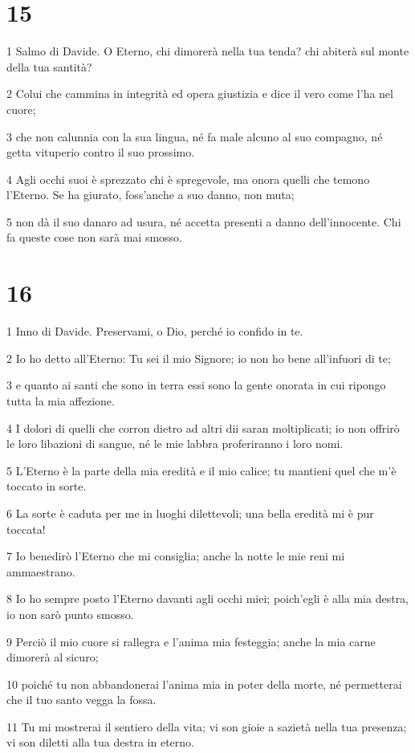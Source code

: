 \chapter{15}

\par 1 Salmo di Davide. O Eterno, chi dimorerà nella tua tenda? chi abiterà sul monte della tua santità?
\par 2 Colui che cammina in integrità ed opera giustizia e dice il vero come l'ha nel cuore;
\par 3 che non calunnia con la sua lingua, né fa male alcuno al suo compagno, né getta vituperio contro il suo prossimo.
\par 4 Agli occhi suoi è sprezzato chi è spregevole, ma onora quelli che temono l'Eterno. Se ha giurato, foss'anche a suo danno, non muta;
\par 5 non dà il suo danaro ad usura, né accetta presenti a danno dell'innocente. Chi fa queste cose non sarà mai smosso.

\chapter{16}

\par 1 Inno di Davide. Preservami, o Dio, perché io confido in te.
\par 2 Io ho detto all'Eterno: Tu sei il mio Signore; io non ho bene all'infuori di te;
\par 3 e quanto ai santi che sono in terra essi sono la gente onorata in cui ripongo tutta la mia affezione.
\par 4 I dolori di quelli che corron dietro ad altri dii saran moltiplicati; io non offrirò le loro libazioni di sangue, né le mie labbra proferiranno i loro nomi.
\par 5 L'Eterno è la parte della mia eredità e il mio calice; tu mantieni quel che m'è toccato in sorte.
\par 6 La sorte è caduta per me in luoghi dilettevoli; una bella eredità mi è pur toccata!
\par 7 Io benedirò l'Eterno che mi consiglia; anche la notte le mie reni mi ammaestrano.
\par 8 Io ho sempre posto l'Eterno davanti agli occhi miei; poich'egli è alla mia destra, io non sarò punto smosso.
\par 9 Perciò il mio cuore si rallegra e l'anima mia festeggia; anche la mia carne dimorerà al sicuro;
\par 10 poiché tu non abbandonerai l'anima mia in poter della morte, né permetterai che il tuo santo vegga la fossa.
\par 11 Tu mi mostrerai il sentiero della vita; vi son gioie a sazietà nella tua presenza; vi son diletti alla tua destra in eterno.

